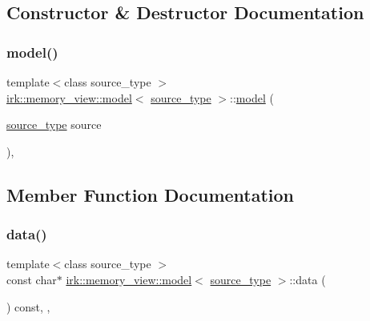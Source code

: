 \subsection{Constructor \& Destructor Documentation}
\mbox{\label{classirk_1_1memory__view_1_1model_a47843c84f96ecb25ce8c81ce47c214b4}} 
\subsubsection{\texorpdfstring{model()}{model()}}
{\footnotesize\ttfamily template$<$class source\+\_\+type $>$ \\
\mbox{\hyperlink{classirk_1_1memory__view_1_1model}{irk\+::memory\+\_\+view\+::model}}$<$ \mbox{\hyperlink{irk-score_8cpp_a73f57f67fb1e33bdbfd80bfba2fc9ffe}{source\+\_\+type}} $>$\+::\mbox{\hyperlink{classirk_1_1memory__view_1_1model}{model}} (\begin{DoxyParamCaption}\item[{\mbox{\hyperlink{irk-score_8cpp_a73f57f67fb1e33bdbfd80bfba2fc9ffe}{source\+\_\+type}}}]{source }\end{DoxyParamCaption})\hspace{0.3cm}{\ttfamily [inline]}, {\ttfamily [explicit]}}



\subsection{Member Function Documentation}
\mbox{\label{classirk_1_1memory__view_1_1model_a5a7c432c460f99bd8b78c29ef6d44009}} 
\subsubsection{\texorpdfstring{data()}{data()}}
{\footnotesize\ttfamily template$<$class source\+\_\+type $>$ \\
const char$\ast$ \mbox{\hyperlink{classirk_1_1memory__view_1_1model}{irk\+::memory\+\_\+view\+::model}}$<$ \mbox{\hyperlink{irk-score_8cpp_a73f57f67fb1e33bdbfd80bfba2fc9ffe}{source\+\_\+type}} $>$\+::data (\begin{DoxyParamCaption}{ }\end{DoxyParamCaption}) const\hspace{0.3cm}{\ttfamily [inline]}, {\ttfamily [override]}, {\ttfamily [virtual]}}



